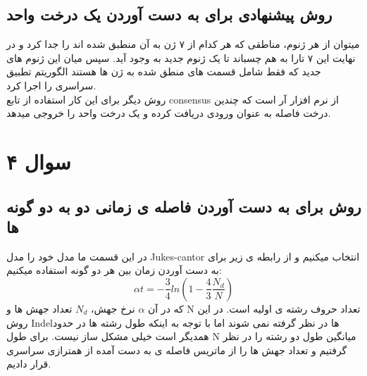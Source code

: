 \documentclass[11pt, oneside]{article}
\begin{document}
\subsection*{روش پیشنهادی برای به دست آوردن یک درخت واحد}
میتوان از هر ژنوم، مناطقی که هر کدام از ۷ ژن به آن منطبق شده اند را جدا کرد و در نهایت این ۷ تارا به هم چسباند تا یک ژنوم جدید به وجود آید. سپس میان این ژنوم های جدید که فقط شامل قسمت های منطق شده به ژن ها هستند الگوریتم تطبیق سراسری را اجرا کرد.
\cite{a3}\\
روش دیگر برای این کار استفاده از تابع consensus از نرم افزار آر است که چندین درخت فاصله به عنوان ورودی دریافت کرده و یک درخت واحد را خروجی میدهد.
\section*{سوال ۴}
\subsection*{روش برای به دست آوردن فاصله ی زمانی دو به دو گونه ها}
در این قسمت ما مدل خود را مدل Jukes-cantor انتخاب میکنیم و از رابطه ی زیر برای به دست آوردن زمان بین هر دو گونه استفاده میکنیم:
$$\alpha t = -\frac{3}{4}ln(1- \frac{4}{3}\frac{N_d}{N})$$
که در آن $\alpha$ نرخ جهش، $N_d$ تعداد جهش ها و N تعداد حروف رشته ی اولیه است. در این روش Indelها در نظر گرفته نمی شوند اما با توجه به اینکه طول رشته ها در حدود همدیگر است خیلی مشکل ساز نیست. برای طول N میانگین طول دو رشته را در نظر گرفتیم و تعداد جهش ها را از ماتریس فاصله ی به دست آمده از همترازی سراسری قرار دادیم.
\hyperlink{}{\cite{a4, a5}}
\end{document}
